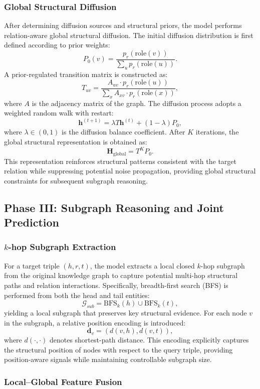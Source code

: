 \documentclass[preprint,12pt]{elsarticle}
\begin{document}
\subsubsection{Global Structural Diffusion}
After determining diffusion sources and structural priors, the model performs relation-aware global structural diffusion. The initial diffusion distribution is first defined according to prior weights:
\[
P_0(v)=\frac{p_r(\text{role}(v))}{\sum_{u}p_r(\text{role}(u))}.
\]
A prior-regulated transition matrix is constructed as:
\[
T_{uv}=
\frac{A_{uv}\cdot p_r(\text{role}(u))}{\sum_x A_{xv}\cdot p_r(\text{role}(x))},
\]
where $A$ is the adjacency matrix of the graph. The diffusion process adopts a weighted random walk with restart:
\[
\mathbf{h}^{(t+1)} = \lambda T \mathbf{h}^{(t)} + (1-\lambda)P_0,
\]
where $\lambda\in(0,1)$ is the diffusion balance coefficient. After $K$ iterations, the global structural representation is obtained as:
\[
\mathbf{H}_{\text{global}}=T^K P_0.
\]
This representation reinforces structural patterns consistent with the target relation while suppressing potential noise propagation, providing global structural constraints for subsequent subgraph reasoning.



%
\subsection{Phase III: Subgraph Reasoning and Joint Prediction}

\subsubsection{$k$-hop Subgraph Extraction}

For a target triple $(h,r,t)$, the model extracts a local closed $k$-hop subgraph from the original knowledge graph to capture potential multi-hop structural paths and relation interactions. Specifically, breadth-first search (BFS) is performed from both the head and tail entities:
\[
\mathcal{G}_{sub} = \text{BFS}_k(h) \cup \text{BFS}_k(t),
\]
yielding a local subgraph that preserves key structural evidence. For each node $v$ in the subgraph, a relative position encoding is introduced:
\[
\mathbf{d}_v=(d(v,h),d(v,t)),
\]
where $d(\cdot,\cdot)$ denotes shortest-path distance. This encoding explicitly captures the structural position of nodes with respect to the query triple, providing position-aware signals while maintaining controllable subgraph size.

\subsubsection{Local–Global Feature Fusion}
\end{document}
